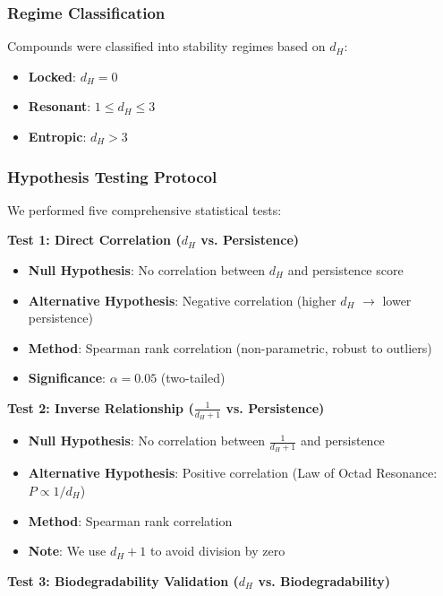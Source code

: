 \documentclass[11pt,letterpaper]{article}
\begin{document}
\subsubsection{Regime Classification}

Compounds were classified into stability regimes based on $d_H$:
\begin{itemize}
    \item \textbf{Locked}: $d_H = 0$
    \item \textbf{Resonant}: $1 \leq d_H \leq 3$
    \item \textbf{Entropic}: $d_H > 3$
\end{itemize}

\subsubsection{Hypothesis Testing Protocol}

We performed five comprehensive statistical tests:

\textbf{Test 1: Direct Correlation ($d_H$ vs. Persistence)}

\begin{itemize}
    \item \textbf{Null Hypothesis}: No correlation between $d_H$ and persistence score
    \item \textbf{Alternative Hypothesis}: Negative correlation (higher $d_H$ $\rightarrow$ lower persistence)
    \item \textbf{Method}: Spearman rank correlation (non-parametric, robust to outliers)
    \item \textbf{Significance}: $\alpha = 0.05$ (two-tailed)
\end{itemize}

\textbf{Test 2: Inverse Relationship ($\frac{1}{d_H+1}$ vs. Persistence)}

\begin{itemize}
    \item \textbf{Null Hypothesis}: No correlation between $\frac{1}{d_H+1}$ and persistence
    \item \textbf{Alternative Hypothesis}: Positive correlation (Law of Octad Resonance: $P \propto 1/d_H$)
    \item \textbf{Method}: Spearman rank correlation
    \item \textbf{Note}: We use $d_H+1$ to avoid division by zero
\end{itemize}

\textbf{Test 3: Biodegradability Validation ($d_H$ vs. Biodegradability)}
\end{document}

